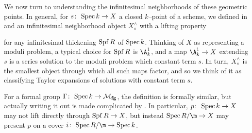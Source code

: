 We now turn to understanding the infinitesimal neighborhoods of these geometric points.  In general, for \(s\colon\thinspace \operatorname{Spec} k \to X\) a closed \(k\)--point of a scheme, we defined in  and  an infinitesimal neighborhood object \(X^\wedge_s\) with a lifting property
\begin{center}
\end{center}
for any infinitesimal thickening \(\operatorname{Spf} R\) of \(\operatorname{Spec} k\).  Thinking of \(X\) as representing a moduli problem, a typical choice for \(\operatorname{Spf} R\) is \(\A^1_k\), and a map \(\A^1_k \to X\) extending \(s\) is a series solution to the moduli problem which constant term \(s\).  In turn, \(X^\wedge_s\) is the smallest object through which all such maps factor, and so we think of it as classifying Taylor expansions of solutions with constant term \(s\).

For a formal group \(\Gamma\colon\thinspace \operatorname{Spec} k \to \mathcal{M}_{\mathbf{fg}}\), the definition is formally similar, but actually writing it out is made complicated by .  In particular, \(p\colon\thinspace \operatorname{Spec} k \to X\) may not lift directly through \(\operatorname{Spf} R \to X\), but instead \(\Spec R/\m \to X\) may present \(p\) on a cover \(i\co \Spec R/\m \to \Spec k\).

